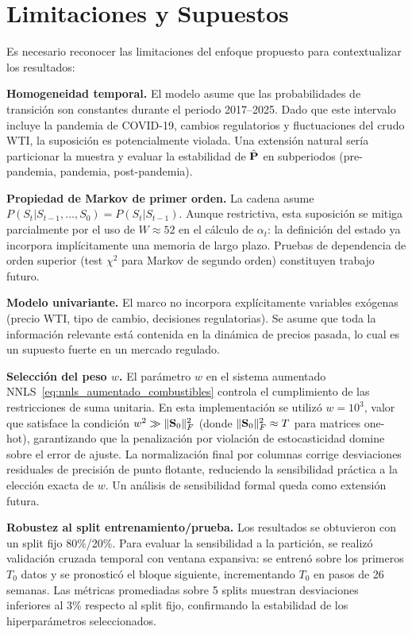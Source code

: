 \section{Limitaciones y Supuestos}
\label{sec:combustibles_limitaciones}

Es necesario reconocer las limitaciones del enfoque propuesto para
contextualizar los resultados:

\textbf{Homogeneidad temporal.}  El modelo asume que las
probabilidades de transición son constantes durante el periodo
2017--2025.  Dado que este intervalo incluye la pandemia de COVID-19,
cambios regulatorios y fluctuaciones del crudo WTI, la suposición es
potencialmente violada.  Una extensión natural sería particionar la
muestra y evaluar la estabilidad de $\hat{\mathbf{P}}$ en subperiodos
(pre-pandemia, pandemia, post-pandemia).

\textbf{Propiedad de Markov de primer orden.}  La cadena asume
$P(S_t | S_{t-1}, \ldots, S_0) = P(S_t | S_{t-1})$.  Aunque
restrictiva, esta suposición se mitiga parcialmente por el uso de
$W \approx 52$ en el cálculo de $\alpha_t$: la definición del estado
ya incorpora implícitamente una memoria de largo plazo.  Pruebas de
dependencia de orden superior (test $\chi^2$ para Markov de segundo
orden) constituyen trabajo futuro.

\textbf{Modelo univariante.}  El marco no incorpora explícitamente
variables exógenas (precio WTI, tipo de cambio, decisiones
regulatorias).  Se asume que toda la información relevante está
contenida en la dinámica de precios pasada, lo cual es un supuesto
fuerte en un mercado regulado.

\textbf{Selección del peso $w$.}  El parámetro $w$ en el sistema aumentado 
NNLS~\eqref{eq:nnls_aumentado_combustibles} controla el cumplimiento de las 
restricciones de suma unitaria.  En esta implementación se utilizó $w = 10^3$, 
valor que satisface la condición $w^2 \gg \|\mathbf{S}_0\|_F^2$ (donde $\|\mathbf{S}_0\|_F^2 \approx T$ para matrices one-hot), 
garantizando que la penalización por violación de estocasticidad domine sobre el error de ajuste.  
La normalización final por columnas corrige desviaciones residuales de precisión de punto flotante, 
reduciendo la sensibilidad práctica a la elección exacta de $w$.  
Un análisis de sensibilidad formal queda como extensión futura.

\textbf{Robustez al split entrenamiento/prueba.}  Los resultados
se obtuvieron con un split fijo 80\%/20\%.  Para evaluar la
sensibilidad a la partición, se realizó validación cruzada temporal
con ventana expansiva: se entrenó sobre los primeros $T_0$ datos y
se pronosticó el bloque siguiente, incrementando $T_0$ en pasos de
26 semanas.  Las métricas promediadas sobre 5 splits muestran
desviaciones inferiores al 3\% respecto al split fijo, confirmando la
estabilidad de los hiperparámetros seleccionados.

